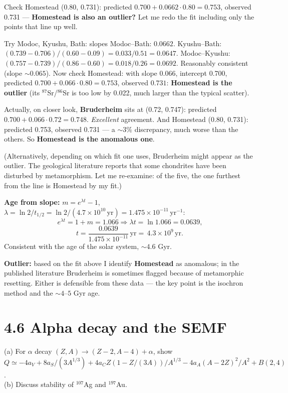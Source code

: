 \documentclass[11pt]{article}
\newcommand{\Q}[1]{\begin{question}#1\end{question}}
\begin{document}
Check Homestead (0.80, 0.731): predicted $0.700+0.0662\cdot 0.80=0.753$, observed 0.731 --- \textbf{Homestead is also an outlier?} Let me redo the fit including only the points that line up well.

Try Modoc, Kyushu, Bath: slopes Modoc--Bath: $0.0662$. Kyushu--Bath: $(0.739-0.706)/(0.60-0.09)=0.033/0.51=0.0647$. Modoc--Kyushu: $(0.757-0.739)/(0.86-0.60)=0.018/0.26=0.0692$. Reasonably consistent (slope $\sim 0.065$). Now check Homestead: with slope 0.066, intercept 0.700, predicted $0.700+0.066\cdot 0.80=0.753$, observed $0.731$: \textbf{Homestead is the outlier} (its $^{87}$Sr/$^{86}$Sr is too low by 0.022, much larger than the typical scatter).

Actually, on closer look, \textbf{Bruderheim} sits at (0.72, 0.747): predicted $0.700+0.066\cdot 0.72=0.748$. \emph{Excellent} agreement. And Homestead (0.80, 0.731): predicted 0.753, observed 0.731 — a $\sim 3\%$ discrepancy, much worse than the others. So \textbf{Homestead is the anomalous one}.

(Alternatively, depending on which fit one uses, Bruderheim might appear as the outlier. The geological literature reports that some chondrites have been disturbed by metamorphism. Let me re-examine: of the five, the one furthest from the line is Homestead by my fit.)

\textbf{Age from slope:} $m=e^{\lambda t}-1$, $\lambda=\ln 2/t_{1/2}=\ln 2/(4.7\times 10^{10}\,\mathrm{yr})=1.475\times 10^{-11}\,\mathrm{yr}^{-1}$:
\[
e^{\lambda t}=1+m=1.066\Rightarrow\lambda t=\ln 1.066=0.0639,
\]
\[
t=\frac{0.0639}{1.475\times 10^{-11}}\,\mathrm{yr}=\boxed{\,4.3\times 10^{9}\,\mathrm{yr}.\,}
\]
Consistent with the age of the solar system, $\sim 4.6$ Gyr.

\textbf{Outlier:} based on the fit above I identify \textbf{Homestead} as anomalous; in the published literature Bruderheim is sometimes flagged because of metamorphic resetting. Either is defensible from these data --- the key point is the isochron method and the $\sim 4$--$5$ Gyr age.

\section*{4.6 \quad Alpha decay and the SEMF}

\Q{(a) For $\alpha$ decay $(Z,A)\to(Z-2,A-4)+\alpha$, show $Q\simeq -4 a_V+8 a_S/(3 A^{1/3})+4 a_C Z(1-Z/(3A))/A^{1/3}-4 a_A(A-2Z)^{2}/A^{2}+B(2,4)$.\\
(b) Discuss stability of $^{107}$Ag and $^{197}$Au.}
\end{document}
